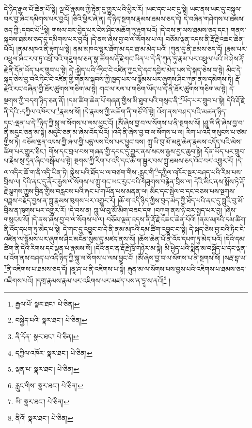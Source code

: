དེ་ཉིད་རྒྱལ་པོ་ཆེན་པོ་སྟེ། ལྔ་པོ་རྣམས་ཀྱི་རྟེན་དུ་གྱུར་པའི་ཕྱིར་རོ། །ཡང་དང་ཡང་དུ་སྟེ། ཡང་ནས་ཡང་དུ་བསྐུལ་བར་བྱ་ཞིང་དམིགས་པར་བྱའོ། །ཅིའི་ཕྱིར་ཞེ་ན། དེ་ཉིད་སྔགས་རྣམས་ཐམས་ཅད་དེ། དེ་བཞིན་གཤེགས་པ་ཐམས་ཅད་ཀྱི་:དབང་པོ་\footnote{རྒྱལ་པོ་  སྣར་ཐང་།  པེ་ཅིན། }སྟེ། གསལ་བར་བྱེད་པར་ངེས་ཤིང་མཆོག་ཏུ་རྟག་པའོ། །དེ་བས་ན་ལས་ཐམས་ཅད་དང་། གནས་སྐབས་ཐམས་ཅད་དུ་དམིགས་པར་བྱའོ། །དེ་ནས་ཞེས་བྱ་བ་ལ་སོགས་པ་ལ། བཅོམ་ལྡན་འདས་ནི་རྡོ་རྗེ་འཆང་ཆེན་པོའོ། །ནམ་མཁའ་ནི་རྟག་པ་སྟེ། ནམ་མཁའ་ལྟར་ཐོག་མ་དང་ཐ་མ་མེད་པའོ། །ཀུན་དུ་ནི་ཐམས་ཅད་དོ། །རྣམ་པར་འཕྲུལ་ཞིང་རབ་ཏུ་འཕྲོ་བའི་གཟུགས་ཅན་སྣ་ཚོགས་རྡོ་རྗེ་གང་ཡིན་པ་དེ་ནི་ཀུན་ཏུ་རྣམ་པར་འཕྲུལ་པའི་ཡེ་ཤེས་རྡོ་རྗེ་ནི་དོན་ཡོད་པར་གྲུབ་པ་སྟེ། དེ་:སྐྱེད་པའི་\footnote{བསྐྱེད་པའི་  སྣར་ཐང་།  པེ་ཅིན། }ཏིང་ངེ་འཛིན་ཀྱང་དེ་དང་དབྱེར་མེད་པས་དེ་སྐད་ཅེས་བ་སྟེ། མིང་དེ་སྐད་ཅེས་བྱ་བའི་ཏིང་ངེ་འཛིན་གྱི་གནས་སྐབས་ཀྱི་ཁྱད་པར་ལ་སྙོམས་པར་ཞུགས་ཤིང་ཀུན་ནས་དམིགས་ཏེ། རྡོ་རྗེའི་རང་བཞིན་གྱི་ཐོར་ཚུགས་གཅིག་མ་སྟེ། གང་ལ་རལ་པ་གཅིག་ཡོད་པ་དེ་ནི་ཐོར་ཚུགས་གཅིག་མ་སྟེ། དེ་སྔགས་ཀྱི་བདག་ཉིད་ཅན་ནོ། །དམ་ཚིག་ཆེན་པོ་གཞན་གྱིས་མི་ཐུབ་པའི་གསུང་ནི་\footnote{ནི་དོན་  སྣར་ཐང་།  པེ་ཅིན། }ཡོད་པར་གྲུབ་པ་སྟེ། དེའི་རྡོ་རྗེ་ནི་དེའི་:དཀྱིལ་འཁོར་པ་\footnote{དཀྱིལ་འཁོར་  སྣར་ཐང་།  པེ་ཅིན། }རྣམས་སོ། །དེ་རྣམས་ཀྱི་མཆོག་ནི་གཙོ་བོ་སྟེ། འོག་ནས་བཤད་པའི་མཚན་ཉིད་དང་:ལྡན་པ་དེ་\footnote{ལྡན་པ་  སྣར་ཐང་།  པེ་ཅིན། }ཉིད་ཀྱི་སྐུ་ལ་སོགས་པ་ལས་ཕྱུང་ངོ། །ཨོཾ་ཞེས་བྱ་བ་ལ་སོགས་པ་ནི་སྔགས་སོ། །ཤཱུ་ལི་ནི་ཞེས་བྱ་བ་ནི་མདུང་ཅན་མ་སྟེ། མདུང་ཅན་མ་ཞེས་བོད་པའོ། །འདི་ནི་ཞེས་བྱ་བ་ལ་སོགས་པ་ལ། རིག་པ་འདི་གསུངས་པ་ཙམ་གྱིས་ཏེ། བཅོམ་ལྡན་འདས་ཀྱི་ཞལ་གྱི་པདྨ་ལས་ངེས་པར་ཕྱུང་བས། ཀླུ་ཡི་བུ་མོ་མཐུ་ཆེན་རྣམས་འདོད་པའི་མེས་ཚིག་པར་གྱུར་ཅིང་། གོས་དང་བྲལ་བས་གཞན་གྱི་དབང་དུ་གྱུར་ནས་སངས་རྒྱས་བྱང་ཆུབ་སྟེ། དོན་ཡོད་པར་གྲུབ་པ་རྗེས་སུ་དྲན་ཞིང་བསྒོམ་པ་སྟེ། སྔགས་ཀྱི་རིག་པ་འདི་དང་ཆོ་ག་སྦྱར་བས་ཀླུ་ཐམས་ཅད་འོང་བར་འགྱུར་རོ། །དེ་ལ་འདིར་ཆོ་ག་ནི་འདི་ཡིན་ཏེ། སྐྱེས་པའི་ཐོད་པ་ལ་བཙག་གིས་:རླུང་གི་\footnote{རླུང་གིས་  སྣར་ཐང་།  པེ་ཅིན། }དཀྱིལ་འཁོར་སྔར་བཤད་པའི་རིམ་པས་བྲིས་ལ། དེའི་ནང་དུ་ནོར་རྒྱས་ལ་སོགས་པ་ཀླུ་གང་ཡང་རུང་བའི་གཟུགས་བརྙེན་བྲིས་ལ། དེའི་མིང་ནས་སྨོས་ཏེ་རྡོ་རྗེ་ལྕགས་ཀྱུས་བྱིན་གྱིས་བརླབས་པའི་རྐང་པ་གཡོན་པས་མནན་ལ། མིང་དང་སྤེལ་བ་དང་བཅས་པས་སྔགས་བཟླས་བརྗོད་བྱས་ན་ཀླུ་རྣམས་ཁུགས་པར་འགྱུར་རོ། །ཆོ་ག་འདི་ཉིད་ཀྱིས་བུད་མེད་ཀྱི་ཐོད་པའི་ནང་དུ་ཀླུའི་བུ་མོ་བྲིས་ན་ཁུགས་པར་འགྱུར་རོ། །དེ་བས་ན། ཀླུ་ཡི་བུ་མོ་མིག་བཟང་དག །བཀུག་ནས་ཉེ་བར་སྤྱད་པར་བྱ། །ཞེས་གསུངས་སོ། །དེ་ནས་ཞེས་བྱ་བ་ལ་སོགས་པ་ལ། བཅོམ་ལྡན་འདས་ནི་རྡོ་རྗེ་འཆང་ཆེན་པོའོ། །ནམ་མཁའི་དམ་ཚིག་ནི་འོད་དཔག་ཏུ་མེད་པ་སྟེ། དེ་གང་དུ་འབྱུང་བ་དེ་ནི་ནམ་མཁའི་དམ་ཚིག་འབྱུང་བ་སྟེ། དེ་སྐད་ཅེས་བྱ་བའི་ཏིང་ངེ་འཛིན་ལ་སྙོམས་པར་ཞུགས་ཤིང་མངོན་སུམ་དུ་མཛད་ནས་སོ། །ཆོས་ཆེན་པོ་ནི་འོད་དཔག་ཏུ་མེད་པའོ། །དེའི་དམ་ཚིག་ནི་དེའི་རིགས་དང་ལྡན་པ་རྣམས་སོ། །དེའི་ནང་ན་རྡོ་རྗེ་ཁྲོ་གཉེར་མ་སྟེ། མི་ཕྱེད་པའི་སྨིན་མ་བསྐྱོད་པ་དང་ལྡན་པ་འོག་ནས་བཤད་པ་འདི་ཉིད་ཀྱི་སྐུ་ལ་སོགས་པ་ལས་ཕྱུང་ངོ། །ཨོཾ་ཞེས་བྱ་བ་ལ་སོགས་པ་ནི་སྔགས་སོ། །སརྦ་བྷ་ཡ་\footnote{ཡི་  སྣར་ཐང་།  པེ་ཅིན། }ནི་འཇིགས་པ་ཐམས་ཅད་དོ། །ནཱ་ཤ་ཡ་ནི་འཇིགས་པ་སྟེ། རྐུན་མ་ལ་སོགས་པས་བྱས་པའི་འཇིགས་པ་ཐམས་ཅད་འཇིགས་པའོ། །དགྲ་རྣམས་རྣམ་པར་འཇིགས་པར་མཛད་པས་ན་ཏྲཱ་ས་ནའོ།\footnote{ནིའོ།  སྣར་ཐང་།  པེ་ཅིན། } །
